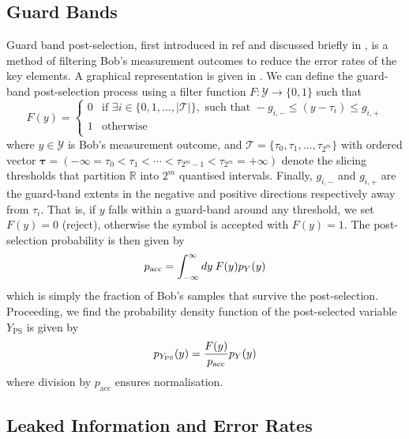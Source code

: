 ﻿\documentclass[12pt]{article}
\begin{document}
\subsection{Guard Bands}\label{subsec: guard bands}

Guard band post-selection, first introduced in ref \cite{Weerasinghe-2023} and discussed briefly in , is a method of filtering Bob's measurement outcomes to reduce the error rates of the key elements. A graphical representation is given in . We can define the guard-band post-selection process using a filter function $F : \mathcal{Y} \rightarrow \{0, 1\}$ such that
\begin{equation}
  \label{eq: F}
F(y) = \begin{cases}
  0 & \text{if } \exists i \in \{0, 1, \ldots, |\mathcal{T}|\}, \text{ such that } -g_{i,-} \leq (y - \tau_i) \leq g_{i,+} \\
  1 & \text{otherwise} \\
\end{cases}
\end{equation}
where $y \in \mathcal{Y}$ is Bob's measurement outcome, and $\mathcal{T} = \{\tau_0,\tau_1,\ldots,\tau_{2^m}\}$ with ordered vector $\boldsymbol{\tau} = (-\infty = \tau_0 < \tau_1 < \cdots < \tau_{2^m-1} < \tau_{2^m} = +\infty)$ denote the slicing thresholds that partition $\mathbb{R}$ into $2^m$ quantised intervals. Finally, $g_{i,-}$ and $g_{i,+}$ are the guard-band extents in the negative and positive directions respectively away from $\tau_i$. That is, if $y$ falls within a guard-band around any threshold, we set $F(y) = 0$ (reject), otherwise the symbol is accepted with $F(y) = 1$. The post-selection probability is then given by
\begin{equation}
  \label{eq: p pass}
  p_\text{acc} = \int_{-\infty}^{\infty} dy \: F(y) p_Y(y) \\
\end{equation}
which is simply the fraction of Bob's samples that survive the post-selection. Proceeding, we find the probability density function of the post-selected variable $Y_\text{PS}$ is given by
\begin{equation}
  \label{eq: p PS}
  p_{Y_\text{PS}}(y) = \frac{F(y)}{p_\text{acc}}p_Y(y) \\
\end{equation}
where division by $p_\text{acc}$ ensures normalisation.

\subsection{Leaked Information and Error Rates}\label{subsec: leaked information and error rates}
\end{document}
